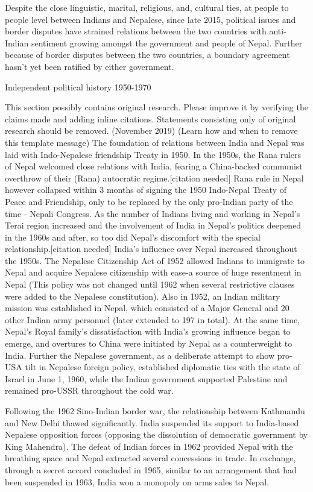 \documentclass[
  openany]{book}
\begin{document}
Despite the close linguistic, marital, religious, and, cultural ties, at people to people level between Indians and Nepalese, since late 2015, political issues and border disputes have strained relations between the two countries with anti-Indian sentiment growing amongst the government and people of Nepal. Further because of border disputes between the two countries, a boundary agreement hasn't yet been ratified by either government.

Independent political history
1950-1970

This section possibly contains original research. Please improve it by verifying the claims made and adding inline citations. Statements consisting only of original research should be removed. (November 2019) (Learn how and when to remove this template message)
The foundation of relations between India and Nepal was laid with Indo-Nepalese friendship Treaty in 1950. In the 1950s, the Rana rulers of Nepal welcomed close relations with India, fearing a China-backed communist overthrow of their (Rana) autocratic regime.{[}citation needed{]} Rana rule in Nepal however collapsed within 3 months of signing the 1950 Indo-Nepal Treaty of Peace and Friendship, only to be replaced by the only pro-Indian party of the time - Nepali Congress. As the number of Indians living and working in Nepal's Terai region increased and the involvement of India in Nepal's politics deepened in the 1960s and after, so too did Nepal's discomfort with the special relationship.{[}citation needed{]} India's influence over Nepal increased throughout the 1950s. The Nepalese Citizenship Act of 1952 allowed Indians to immigrate to Nepal and acquire Nepalese citizenship with ease-a source of huge resentment in Nepal (This policy was not changed until 1962 when several restrictive clauses were added to the Nepalese constitution). Also in 1952, an Indian military mission was established in Nepal, which consisted of a Major General and 20 other Indian army personnel (later extended to 197 in total). At the same time, Nepal's Royal family's dissatisfaction with India's growing influence began to emerge, and overtures to China were initiated by Nepal as a counterweight to India. Further the Nepalese government, as a deliberate attempt to show pro-USA tilt in Nepalese foreign policy, established diplomatic ties with the state of Israel in June 1, 1960, while the Indian government supported Palestine and remained pro-USSR throughout the cold war.

Following the 1962 Sino-Indian border war, the relationship between Kathmandu and New Delhi thawed significantly. India suspended its support to India-based Nepalese opposition forces (opposing the dissolution of democratic government by King Mahendra). The defeat of Indian forces in 1962 provided Nepal with the breathing space and Nepal extracted several concessions in trade. In exchange, through a secret accord concluded in 1965, similar to an arrangement that had been suspended in 1963, India won a monopoly on arms sales to Nepal.
\end{document}
